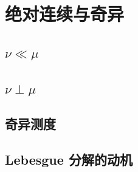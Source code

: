 \section{绝对连续与奇异}
\label{b1:sec:0603}


\subsection{\texorpdfstring{\(\nu\ll\mu\)}{μ}}
\label{b1:subsec:060301}

\subsection{\texorpdfstring{\(\nu\perp\mu\)}{μ}}
\label{b1:subsec:060302}

\subsection{奇异测度}
\label{b1:subsec:060303}

\subsection{Lebesgue 分解的动机}
\label{b1:subsec:060304}


